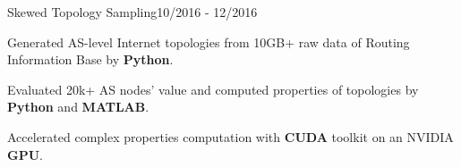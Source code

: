\begin{rSubsection}{Skewed Topology Sampling}{10/2016 - 12/2016}{}{} 
\item Generated AS-level Internet topologies from 10GB+ raw data of Routing Information Base by {\bf Python}. 
\item Evaluated 20k+ AS nodes’ value and computed properties of topologies by {\bf Python} and {\bf MATLAB}. 
\item Accelerated complex properties computation with {\bf CUDA} toolkit on an NVIDIA {\bf GPU}.
\end{rSubsection} 